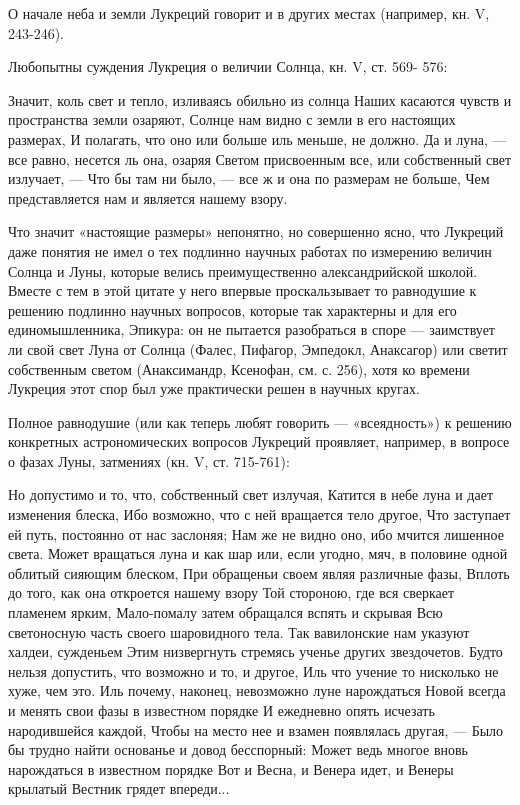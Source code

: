 О начале неба и земли Лукреций говорит и в других местах (например,
кн. V, 243-246).

Любопытны суждения Лукреция о величии Солнца, кн. V, ст. 569- 576:

Значит, коль свет и тепло, изливаясь обильно из солнца Наших касаются
чувств и пространства земли озаряют, Солнце нам видно с земли в его
настоящих размерах, И полагать, что оно или больше иль меньше, не
должно. Да и луна, --- все равно, несется ль она, озаряя Светом
присвоенным все, или собственный свет излучает, --- Что бы там ни
было, --- все ж и она по размерам не больше, Чем представляется нам и
является нашему взору.

Что значит «настоящие размеры» непонятно, но совершенно ясно, что
Лукреций даже понятия не имел о тех подлинно научных работах по
измерению величин Солнца и Луны, которые велись преимущественно
александрийской школой. Вместе с тем в этой цитате у него впервые
проскальзывает то равнодушие к решению подлинно научных вопросов,
которые так характерны и для его единомышленника, Эпикура: он не
пытается разобраться в споре --- заимствует ли свой свет Луна от
Солнца (Фалес, Пифагор, Эмпедокл, Анаксагор) или светит собственным
светом (Анаксимандр, Ксенофан, см. с. 256), хотя ко времени Лукреция
этот спор был уже практически решен в научных кругах.

Полное равнодушие (или как теперь любят говорить --- «всеядность») к
решению конкретных астрономических вопросов Лукреций проявляет,
например, в вопросе о фазах Луны, затмениях (кн. V, ст. 715-761):

Но допустимо и то, что, собственный свет излучая, Катится в небе луна
и дает изменения блеска, Ибо возможно, что с ней вращается тело
другое, Что заступает ей путь, постоянно от нас заслоняя; Нам же не
видно оно, ибо мчится лишенное света. Может вращаться луна и как шар
или, если угодно, мяч, в половине одной облитый сияющим блеском, При
обращеньи своем являя различные фазы, Вплоть до того, как она
откроется нашему взору Той стороною, где вся сверкает пламенем ярким,
Мало-помалу затем обращался вспять и скрывая Всю светоносную часть
своего шаровидного тела. Так вавилонские нам указуют халдеи, сужденьем
Этим низвергнуть стремясь ученье других звездочетов. Будто нельзя
допустить, что возможно и то, и другое, Иль что учение то нисколько не
хуже, чем это. Иль почему, наконец, невозможно луне нарождаться Новой
всегда и менять свои фазы в известном порядке И ежедневно опять
исчезать народившейся каждой, Чтобы на место нее и взамен появлялась
другая, --- Было бы трудно найти основанье и довод бесспорный: Может
ведь многое вновь нарождаться в известном порядке Вот и Весна, и
Венера идет, и Венеры крылатый Вестник грядет впереди...

